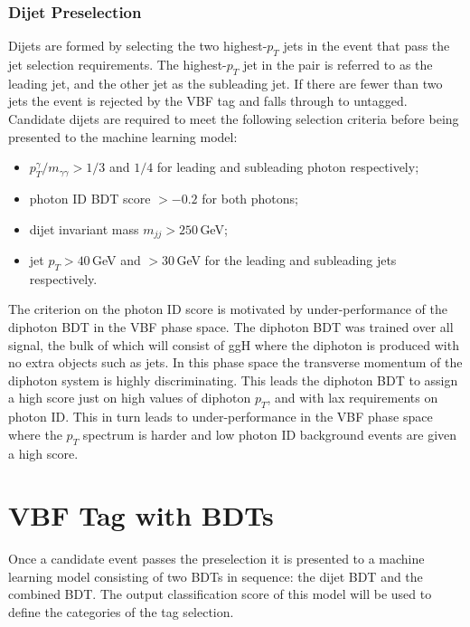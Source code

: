 \subsubsection{Dijet Preselection}
Dijets are formed by selecting the two highest-$p_T$ jets in the event that pass the jet selection requirements. The highest-$p_T$ jet in the pair is referred to as the leading jet, and the other jet as the subleading jet. If there are fewer than two jets the event is rejected by the VBF tag and falls through to untagged. 
Candidate dijets are required to meet the following selection criteria before being presented to the machine learning model:
\begin{itemize}[noitemsep]
    \item $p^{\gamma}_{T}/m_{\gamma\gamma} > 1/3$ and $1/4$ for leading and subleading photon respectively;
    \item photon ID BDT score $> -0.2$ for both photons;
    \item dijet invariant mass $m_{jj} > 250$\,GeV;
    \item jet $p_{T} > 40$\,GeV and $> 30$\,GeV for the leading and subleading jets respectively.
\end{itemize}

The criterion on the photon ID score is motivated by under-performance of the diphoton BDT in the VBF phase space. 
The diphoton BDT was trained over all signal, the bulk of which will consist of ggH where the diphoton is produced with no extra objects such as jets. 
In this phase space the transverse momentum of the diphoton system is highly discriminating. 
This leads the diphoton BDT to assign a high score just on high values of diphoton $p_T$, and with lax requirements on photon ID. 
This in turn leads to under-performance in the VBF phase space where the $p_T$ spectrum is harder and low photon ID background events are given a high score. 








\section{VBF Tag with BDTs}
Once a candidate event passes the preselection it is presented to a machine learning model consisting of two BDTs in sequence: the dijet BDT and the combined BDT. 
The output classification score of this model will be used to define the categories of the tag selection. 

